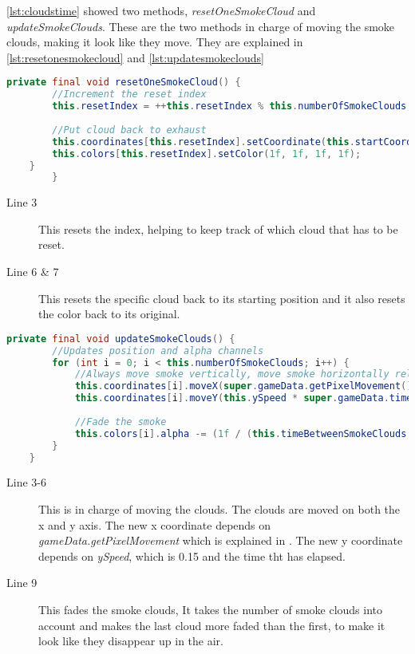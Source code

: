 \autoref{lst:cloudstime} showed two methods, \textit{resetOneSmokeCloud} and \textit{updateSmokeClouds}. These are the two methods in charge of moving the smoke clouds, making it look like they move. They are explained in \autoref{lst:resetonesmokecloud} and \autoref{lst:updatesmokeclouds}

\begin{lstlisting}[language=java,firstnumber=1,caption={Smoke clouds getting reset based on time intervals},label=lst:resetonesmokecloud]
    private final void resetOneSmokeCloud() {
        //Increment the reset index
        this.resetIndex = ++this.resetIndex % this.numberOfSmokeClouds;
        
        //Put cloud back to exhaust
        this.coordinates[this.resetIndex].setCoordinate(this.startCoordinate.getX(), this.startCoordinate.getY());
        this.colors[this.resetIndex].setColor(1f, 1f, 1f, 1f);
    }
        }
\end{lstlisting}

\begin{description}
\item[Line 3] This resets the index, helping to keep track of which cloud that has to be reset. 
\item[Line 6 \& 7] This resets the specific cloud back to its starting position and it also resets the color back to its original. 
\end{description}
 
\begin{lstlisting}[language=java,firstnumber=1,caption={Smoke clouds getting reset based on time intervals},label=lst:updatesmokeclouds]
    private final void updateSmokeClouds() {
        //Updates position and alpha channels
        for (int i = 0; i < this.numberOfSmokeClouds; i++) {
            //Always move smoke vertically, move smoke horizontally relative to the train speed.
            this.coordinates[i].moveX(super.gameData.getPixelMovement());
            this.coordinates[i].moveY(this.ySpeed * super.gameData.timeDifference);
            
            //Fade the smoke
            this.colors[i].alpha -= (1f / (this.timeBetweenSmokeClouds * this.numberOfSmokeClouds)) * super.gameData.timeDifference;
        }
    }
\end{lstlisting}

\begin{description}
\item[Line 3-6] This is in charge of moving the clouds. The clouds are moved on both the x and y axis. The new x coordinate depends on \textit{gameData.getPixelMovement} which is explained in . The new y coordinate depends on \textit{ySpeed}, which is 0.15  and the time tht has elapsed.
\item[Line 9] This fades the smoke clouds, It takes the number of smoke clouds into account and makes the last cloud more faded than the first, to make it look like they disappear up in the air. 
\end{description}


